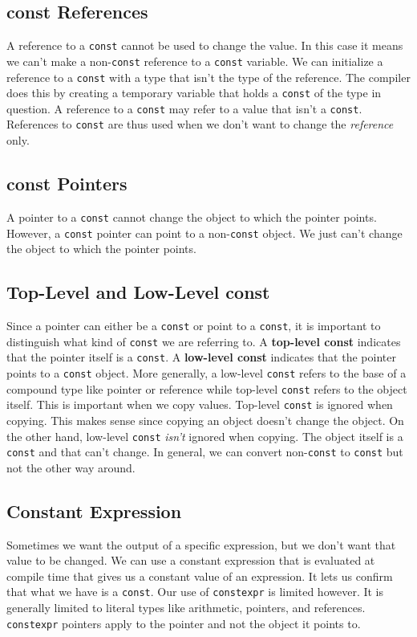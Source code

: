 \documentclass[12pt, a4paper]{report}
\begin{document}
\subsection{const References}
A reference to a \verb|const| cannot be used to change the value. In this case it means we can't make a non-\verb|const| reference to a \verb|const| variable. We can initialize a reference to a \verb|const| with a type that isn't the type of the reference. The compiler does this by creating a temporary variable that holds a \verb|const| of the type in question. A reference to a \verb|const| may refer to a value that isn't a \verb|const|. References to \verb|const| are thus used when we don't want to change the \emph{reference} only.
\subsection{const Pointers}
A pointer to a \verb|const| cannot change the object to which the pointer points. However, a \verb|const| pointer can point to a non-\verb|const| object. We just can't change the object to which the pointer points.
\subsection{Top-Level and Low-Level const}
Since a pointer can either be a \verb|const| or point to a \verb|const|, it is important to distinguish what kind of \verb|const| we are referring to. A \textbf{top-level const} indicates that the pointer itself is a \verb|const|. A \textbf{low-level const} indicates that the pointer points to a \verb|const| object. More generally, a low-level \verb|const| refers to the base of a compound type like pointer or reference while top-level \verb|const| refers to the object itself.
This is important when we copy values. Top-level \verb|const| is ignored when copying. This makes sense since copying an object doesn't change the object. On the other hand, low-level \verb|const| \emph{isn't} ignored when copying. The object itself is a \verb|const| and that can't change.
\newline In general, we can convert non-\verb|const| to \verb|const| but not the other way around.
\subsection{Constant Expression}
Sometimes we want the output of a specific expression, but we don't want that value to be changed. We can use a constant expression that is evaluated at compile time that gives us a constant value of an expression. It lets us confirm that what we have is a \verb|const|. Our use of \verb|constexpr| is limited however. It is generally limited to literal types like arithmetic, pointers, and references. \verb|constexpr| pointers apply to the pointer and not the object it points to.
\end{document}
